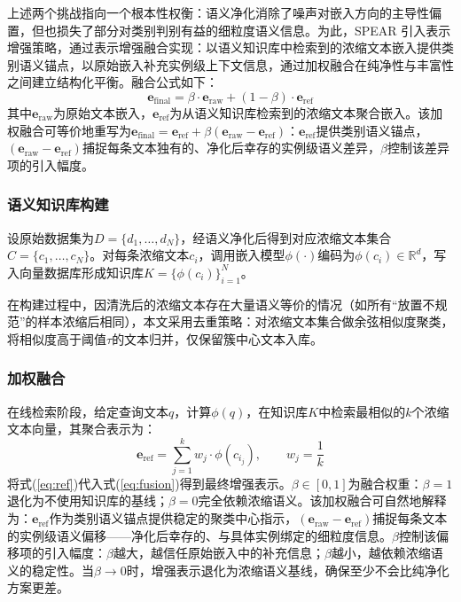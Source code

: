\documentclass[10.5pt,compsoc,UTF8]{CjC}
\theoremstyle{mystyle}
\newcommand{\R}{\mathbb{R}}
\begin{document}
上述两个挑战指向一个根本性权衡：语义净化消除了噪声对嵌入方向的主导性偏置，但也损失了部分对类别判别有益的细粒度语义信息。为此，SPEAR 引入表示增强策略，通过表示增强融合实现：以语义知识库中检索到的浓缩文本嵌入提供类别语义锚点，以原始嵌入补充实例级上下文信息，通过加权融合在纯净性与丰富性之间建立结构化平衡。融合公式如下：
\begin{equation}
\mathbf{e}_{\text{final}} = \beta \cdot \mathbf{e}_{\text{raw}} + (1-\beta) \cdot \mathbf{e}_{\text{ref}}
\label{eq:fusion}
\end{equation}
其中$\mathbf{e}_{\text{raw}}$为原始文本嵌入，$\mathbf{e}_{\text{ref}}$为从语义知识库检索到的浓缩文本聚合嵌入。该加权融合可等价地重写为$\mathbf{e}_{\text{final}} = \mathbf{e}_{\text{ref}} + \beta(\mathbf{e}_{\text{raw}} - \mathbf{e}_{\text{ref}})$：$\mathbf{e}_{\text{ref}}$提供类别语义锚点，$(\mathbf{e}_{\text{raw}} - \mathbf{e}_{\text{ref}})$捕捉每条文本独有的、净化后幸存的实例级语义差异，$\beta$控制该差异项的引入幅度。

\subsubsection{语义知识库构建}

设原始数据集为$D = \{d_1,\ldots,d_N\}$，经语义净化后得到对应浓缩文本集合$C = \{c_1,\ldots,c_N\}$。对每条浓缩文本$c_i$，调用嵌入模型$\phi(\cdot)$编码为$\phi(c_i) \in \R^{d}$，写入向量数据库形成知识库$K = \{\phi(c_i)\}_{i=1}^N$。

在构建过程中，因清洗后的浓缩文本存在大量语义等价的情况（如所有``放置不规范''的样本浓缩后相同），本文采用去重策略：对浓缩文本集合做余弦相似度聚类，将相似度高于阈值$\tau$的文本归并，仅保留簇中心文本入库。

\subsubsection{加权融合}

在线检索阶段，给定查询文本$q$，计算$\phi(q)$，在知识库$K$中检索最相似的$k$个浓缩文本向量，其聚合表示为：
\begin{equation}
\mathbf{e}_{\text{ref}} = \sum_{j=1}^{k} w_j \cdot \phi(c_{i_j}), \qquad w_j = \frac{1}{k}
\label{eq:ref}
\end{equation}
将式(\ref{eq:ref})代入式(\ref{eq:fusion})得到最终增强表示。$\beta \in [0,1]$为融合权重：$\beta = 1$退化为不使用知识库的基线；$\beta = 0$完全依赖浓缩语义。该加权融合可自然地解释为：$\mathbf{e}_{\text{ref}}$作为类别语义锚点提供稳定的聚类中心指示，$(\mathbf{e}_{\text{raw}} - \mathbf{e}_{\text{ref}})$捕捉每条文本的实例级语义偏移——净化后幸存的、与具体实例绑定的细粒度信息。$\beta$控制该偏移项的引入幅度：$\beta$越大，越信任原始嵌入中的补充信息；$\beta$越小，越依赖浓缩语义的稳定性。当$\beta \to 0$时，增强表示退化为浓缩语义基线，确保至少不会比纯净化方案更差。
\end{document}
